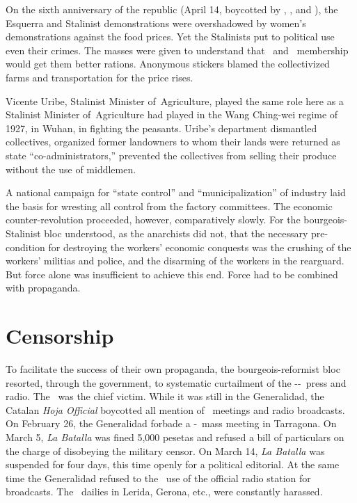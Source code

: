 On the sixth anniversary of the republic (April 14, boycotted by \FAI, \CNT, and \POUM), the Esquerra and Stalinist demonstrations were overshadowed by women’s demonstrations against the food prices. Yet the Stalinists put to political use even their crimes. The masses were given to understand that \PSUC\ and \UGT\ membership would get them better rations. Anonymous stickers blamed the collectivized farms and transportation for the price rises.

Vicente Uribe, Stalinist Minister of~Agriculture, played the same role here as a Stalinist Minister of~Agriculture had played in the Wang Ching-wei regime of 1927, in Wuhan, in fighting the peasants. Uribe’s department dismantled collectives, organized former landowners to whom their lands were returned as state ``co-admin\-istrat\-ors,'' prevented the collectives from selling their produce without the use of middlemen.

A national campaign for ``state control'' and ``municipalization'' of industry laid the basis for wresting all control from the factory committees. The economic counter-revolution proceeded, however, comparatively slowly. For the bourgeois-Stalinist bloc understood, as the anarchists did not, that the necessary pre-condition for destroying the workers’ economic conquests was the crushing of the workers’ militias and police, and the disarming of the workers in the rearguard. But force alone was insufficient to achieve this end. Force had to be combined with propaganda.

\section{Censorship}

To facilitate the success of their own propaganda, the bourgeois-reformist bloc resorted, through the government, to systematic curtailment of the \CNT-\FAI-\POUM\ press and radio. The \POUM\ was the chief victim. While it was still in the Generalidad, the Catalan \emph{Hoja Official} boycotted all mention of \POUM\ meetings and radio broadcasts. On February 26, the Generalidad forbade a \CNT-\POUM\ mass meeting in Tarragona. On March 5, \emph{La Batalla} was fined 5,000 pesetas and refused a bill of particulars on the charge of disobeying the military censor. On March 14, \emph{La Batalla} was suspended for four days, this time openly for a political editorial. At the same time the Generalidad refused to the \POUM\ use of the official radio station for broadcasts. The \POUM\ dailies in Lerida, Gerona, etc., were constantly harassed.

